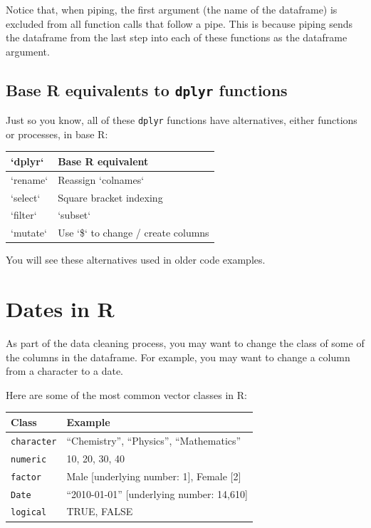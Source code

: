 \documentclass[]{book}
\theoremstyle{definition}
\theoremstyle{definition}
\theoremstyle{definition}
\theoremstyle{remark}
\begin{document}
Notice that, when piping, the first argument (the name of the dataframe)
is excluded from all function calls that follow a pipe. This is because
piping sends the dataframe from the last step into each of these
functions as the dataframe argument.

\subsection{\texorpdfstring{Base R equivalents to \texttt{dplyr}
functions}{Base R equivalents to dplyr functions}}\label{base-r-equivalents-to-dplyr-functions}

Just so you know, all of these \texttt{dplyr} functions have
alternatives, either functions or processes, in base R:

\begin{tabular}{l|l}
\hline
`dplyr` & Base R equivalent\\
\hline
`rename` & Reassign `colnames`\\
\hline
`select` & Square bracket indexing\\
\hline
`filter` & `subset`\\
\hline
`mutate` & Use `\$` to change / create columns\\
\hline
\end{tabular}

You will see these alternatives used in older code examples.

\section{Dates in R}\label{dates-in-r}

As part of the data cleaning process, you may want to change the class
of some of the columns in the dataframe. For example, you may want to
change a column from a character to a date.

Here are some of the most common vector classes in R:

\begin{longtable}[]{@{}ll@{}}
\toprule
Class & Example\tabularnewline
\midrule
\endhead
\texttt{character} & ``Chemistry'', ``Physics'',
``Mathematics''\tabularnewline
\texttt{numeric} & 10, 20, 30, 40\tabularnewline
\texttt{factor} & Male {[}underlying number: 1{]}, Female
{[}2{]}\tabularnewline
\texttt{Date} & ``2010-01-01'' {[}underlying number:
14,610{]}\tabularnewline
\texttt{logical} & TRUE, FALSE\tabularnewline
\bottomrule
\end{longtable}
\end{document}
